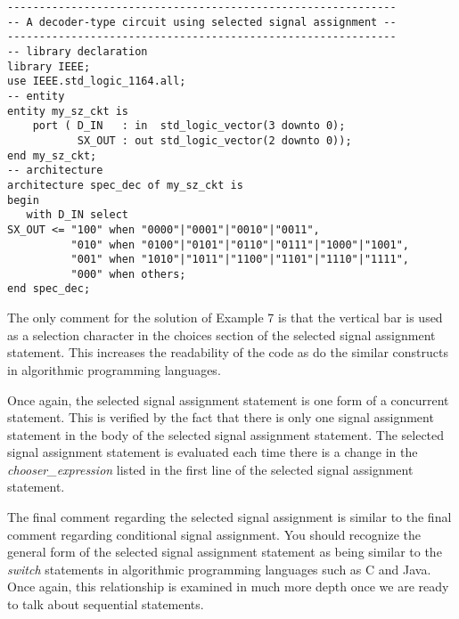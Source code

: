 \noindent
\begin{minipage}{0.99\linewidth}
\begin{lstlisting}[label=example_7, caption=Solution of Example 7.]
-------------------------------------------------------------
-- A decoder-type circuit using selected signal assignment --
-------------------------------------------------------------
-- library declaration
library IEEE;
use IEEE.std_logic_1164.all;
-- entity
entity my_sz_ckt is
    port ( D_IN   : in  std_logic_vector(3 downto 0);
           SX_OUT : out std_logic_vector(2 downto 0)); 
end my_sz_ckt;
-- architecture
architecture spec_dec of my_sz_ckt is
begin
   with D_IN select
SX_OUT <= "100" when "0000"|"0001"|"0010"|"0011", 
          "010" when "0100"|"0101"|"0110"|"0111"|"1000"|"1001", 
          "001" when "1010"|"1011"|"1100"|"1101"|"1110"|"1111", 
          "000" when others;  
end spec_dec;
\end{lstlisting}
\end{minipage}

The only comment for the solution of Example 7 is that the vertical bar is used as a selection character in the choices section of the selected signal assignment statement. This increases the readability of the code as do the similar constructs in algorithmic programming languages.

Once again, the selected signal assignment statement is one form of a concurrent statement. This is verified by the fact that there is only one signal assignment statement in the body of the selected signal assignment statement. The selected signal assignment statement is evaluated each time there is a change in the \textit{chooser\_expression} listed in the first line of the selected signal assignment statement.

The final comment regarding the selected signal assignment is similar to the final comment regarding conditional signal assignment. You should recognize the general form of the selected signal assignment statement as being similar to the \textit{switch} statements in algorithmic programming languages such as C and Java. Once again, this relationship is examined in much more depth once we are ready to talk about sequential statements.

